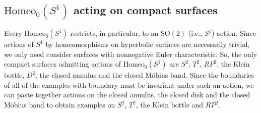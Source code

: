 \documentclass[10pt, oneside]{article}
\theoremstyle{definition}
\theoremstyle{definition}
\begin{document}






\subsection{$\text{Homeo}_0(S^1)$ acting on compact surfaces}
    Every $\text{Homeo}_0(S^1)$ restricts, in particular, to an $\text{SO}(2)$ (i.e., $S^1$) action. Since actions of $S^1$ by homeomorphisms on hyperbolic surfaces are necessarily trivial, we only need consider surfaces with nonnegative Euler characteristic. So, the only compact surfaces admitting actions of $\text{Homeo}_0(S^1)$ are $S^2$, $T^2$, $RP^2$, the Klein bottle, $D^2$, the closed annulus and the closed M\"{o}bius band. Since the boundaries of all of the examples with boundary must be invariant under such an action, we can paste together actions on the closed annulus, the closed disk and the closed M\"{o}bius band to obtain examples on $S^2$, $T^2$, the Klein bottle and $RP^2$. 
    
\end{document}
